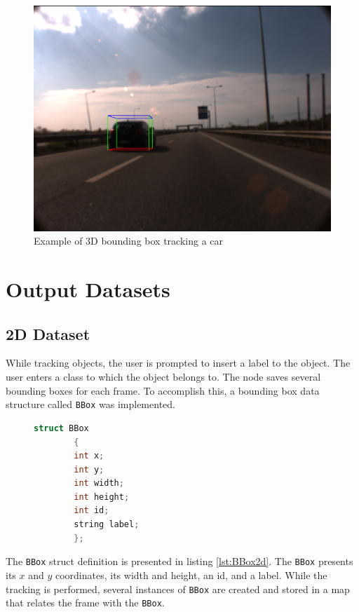 \begin{figure}[htp]
	
	\centering
	\includegraphics[width=.7\textwidth]{caplabel/imgs/3dcube.png}
	
	\caption{Example of 3D bounding box tracking a car}
	\label{fig:cube}
	
\end{figure}

\section{Output Datasets}

\subsection{2D Dataset}

While tracking objects, the user is prompted to insert a label to the object. The user enters a class to which the object belongs to. The node saves several bounding boxes for each frame. To accomplish this, a bounding box data structure called \texttt{BBox} was implemented.

\begin{figure}
	\begin{center}
		\begin{lstlisting}[label={lst:BBox2d}, caption={BBox struct definition used for 2D datasets.},language=c++]
		struct BBox
		{
		int x;
		int y;
		int width;
		int height;
		int id;
		string label;
		};\end{lstlisting}
	\end{center}
\end{figure}

The \texttt{BBox} struct definition is presented in listing \ref{lst:BBox2d}. The \texttt{BBox} presents its $x$ and $y$ coordinates, its width and height, an id, and a label. While the tracking is performed, several instances of \texttt{BBox} are created and stored in a map that relates the frame with the \texttt{BBox}. 

